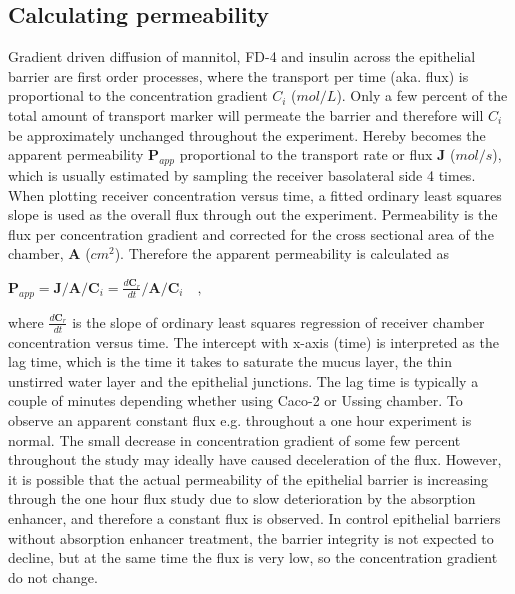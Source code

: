 \subsection{Calculating permeability}
\label{calcPerm}
Gradient driven diffusion of mannitol, FD-4 and insulin across the epithelial barrier are first order processes, where the transport per time (aka. flux) is proportional to the concentration gradient $C_i$ ($mol/L$). Only a few percent of the total amount of transport marker will permeate the barrier and therefore will $C_i$ be approximately unchanged throughout the experiment. Hereby becomes the apparent permeability $\bm{P}_{app}$ proportional to the transport rate or flux $\bm{J}$ ($mol/s$), which is usually estimated by sampling the receiver basolateral side 4 times. When plotting receiver concentration versus time, a fitted ordinary least squares slope is used as the overall flux through out the experiment. Permeability is the flux per concentration gradient and corrected for the cross sectional area of the chamber, $\bm{A}$ ($cm^2$). Therefore the apparent permeability is calculated as

$\bm{P}_{app} = \bm{J} / \bm{A} / \bm{C}_i = \frac{d\bm{C}_r}{dt} / \bm{A} / \bm{C}_i \quad ,$

where $\frac{d\bm{C}_r}{dt}$ is the slope of ordinary least squares regression of receiver chamber concentration versus time. The intercept with x-axis (time) is interpreted as the lag time, which is the time it takes to saturate the mucus layer, the thin unstirred water layer and the epithelial junctions. The lag time is typically a couple of minutes depending whether using Caco-2 or Ussing chamber. To observe an apparent constant flux e.g. throughout a one hour experiment is normal. The small decrease in concentration gradient of some few percent throughout the study may ideally have caused deceleration of the flux. However, it is possible that the actual permeability of the epithelial barrier is increasing through the one hour flux study due to slow deterioration by the absorption enhancer, and therefore a constant flux is observed. In control epithelial barriers without absorption enhancer treatment, the barrier integrity is not expected to decline, but at the same time the flux is very low, so the concentration gradient do not change.

